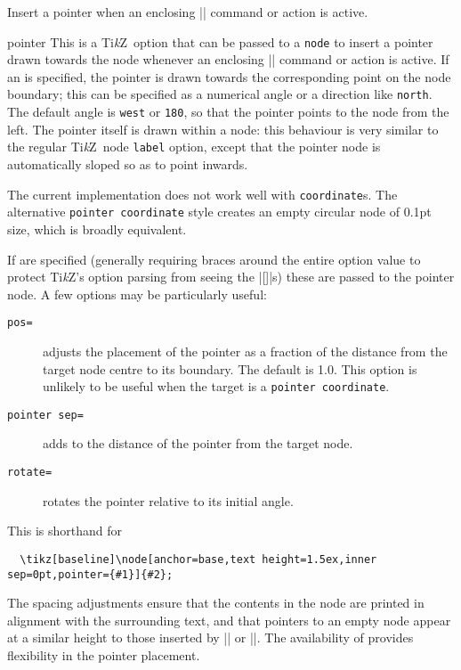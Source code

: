 \documentclass[a4paper]{ltxdoc}
\def\TikZ{Ti\textit{k}Z}
\begin{document}
\begin{command}{\point*}
  Insert a pointer when an enclosing |\point| command or action is active.
\end{command}

\begin{command}{{pointer}\opt{=}}
  This is a \TikZ\ option that can be passed to a \texttt{node} to insert a
  pointer drawn towards the node whenever an enclosing |\point| command or
  action is active.  If an  is specified, the pointer is drawn
  towards the corresponding point on the node boundary; this can be specified as
  a numerical angle or a direction like \texttt{north}.  The default angle is
  \texttt{west} or \texttt{180}, so that the pointer points to the node from the
  left.  The pointer itself is drawn within a node: this behaviour is very
  similar to the regular \TikZ\ node \texttt{label} option, except that the
  pointer node is automatically sloped so as to point inwards.

  The current implementation does not work well with \texttt{coordinate}s.  The
  alternative \texttt{pointer coordinate} style creates an empty circular node
  of 0.1pt size, which is broadly equivalent.

  If  are specified (generally requiring braces
  around the entire option value to protect \TikZ's option parsing from seeing
  the |[]|s) these are passed to the pointer node.  A few options may be
  particularly useful:
  \begin{description}
    \item[\tt pos=] adjusts the placement of the pointer as a
      fraction of the distance from the target node centre to its boundary.  The
      default is 1.0.  This option is unlikely to be useful when the target is a
      \texttt{pointer coordinate}.
    \item[\tt pointer sep=] adds  to the distance of the
      pointer from the target node.
    \item[\tt rotate=] rotates the pointer relative to its initial
      angle.
  \end{description}

\end{command}


\begin{command}{\pointtonode{}}
  This is shorthand for
\begin{verbatim}
  \tikz[baseline]\node[anchor=base,text height=1.5ex,inner sep=0pt,pointer={#1}]{#2};
\end{verbatim}
The spacing adjustments ensure that the contents in the node are printed in
alignment with the surrounding text, and that pointers to an empty node appear
at a similar height to those inserted by |\point| or |\point*|.  The
availability of  provides flexibility in the pointer
placement.
\end{command}
\end{document}
